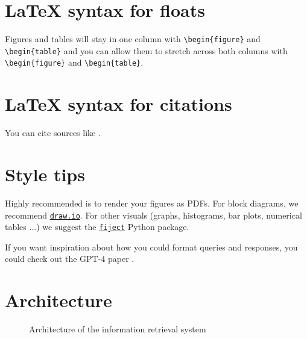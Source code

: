 \documentclass[a4paper,11pt]{article}
\begin{document}
\author{Jan Cichomski (r1026448)}

\twocolumn[\maketitle]


\section{\LaTeX{} syntax for floats}
Figures and tables will stay in one column with \verb|\begin{figure}| and \verb|\begin{table}| and you can allow them to stretch across both columns with \verb|\begin{figure}| and \verb|\begin{table}|.

\section{\LaTeX{} syntax for citations}
You can cite sources like \textcite{ouyang_training_2022}.

\section{Style tips}
Highly recommended is to render your figures as PDFs. For block diagrams, we recommend \href{https://draw.io}{\texttt{draw.io}}. For other visuals (graphs, histograms, bar plots, numerical tables ...) we suggest the \href{https://github.com/bauwenst/fiject}{\texttt{fiject}} Python package.

If you want inspiration about how you could format queries and responses, you could check out the GPT-4 paper \parencite{bubeck_sparks_2023}.


\section{Architecture}
\begin{figure}[H]
    \centering
    
    \caption{Architecture of the information retrieval system}
    \label{fig:architecture}
\end{figure}
\end{document}
